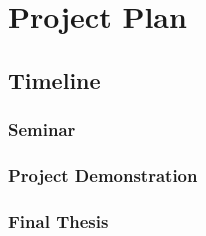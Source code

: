 \section{Project Plan}

\subsection{Timeline}

\subsubsection{Seminar}

\subsubsection{Project Demonstration}

\subsubsection{Final Thesis}